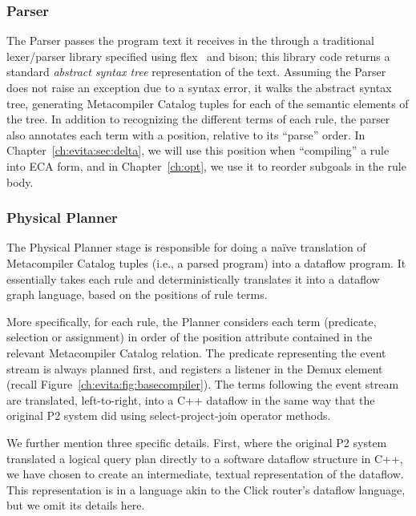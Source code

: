 \subsubsection{Parser}
\label{ch:evita:sec:parser}

The Parser passes the program text it receives in the  through
a traditional lexer/parser library specified using flex~\cite{flexUrl} and
bison\cite{bisonUrl}; this library code returns a standard {\em abstract syntax
tree} representation of the text.  Assuming the Parser does not raise an
exception due to a syntax error, it walks the abstract syntax tree, generating
Metacompiler Catalog tuples for each of the semantic elements of the tree.  In
addition to recognizing the different terms of each rule, the parser also
annotates each term with a position, relative to its ``parse'' order.  In
Chapter~\ref{ch:evita:sec:delta}, we will use this position when ``compiling''
a rule into ECA form, and in Chapter~\ref{ch:opt}, we use it to reorder
subgoals in the rule body.


\subsubsection{Physical Planner}
\label{ch:evita:sec:planner}

The Physical Planner stage is responsible for doing a na\"{i}ve translation of
Metacompiler Catalog tuples (i.e., a parsed \OVERLOG program) into a dataflow
program.  It essentially takes each rule and deterministically translates it
into a dataflow graph language, based on the positions of rule terms.

More specifically, for each rule, the Planner considers each term (predicate,
selection or assignment) in order of the position attribute contained in the
relevant Metacompiler Catalog relation.  The predicate representing the event
stream is always planned first, and registers a listener in the Demux element
(recall Figure~\ref{ch:evita:fig:basecompiler}).  The terms following the event
stream are translated, left-to-right, into a C++ dataflow in the same way that
the original P2 system did using select-project-join operator methods.

We further mention three specific details.  First, where the original P2
system translated a logical query plan directly to a software dataflow
structure in C++, we have chosen to create an intermediate, textual
representation of the dataflow.  This representation is in a language akin to
the Click router's dataflow language, but we omit its details here.

